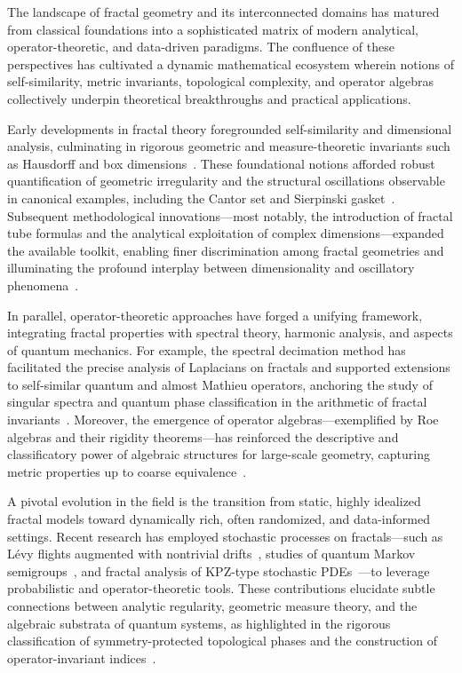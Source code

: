 \documentclass[sigconf]{acmart}
\begin{document}
The landscape of fractal geometry and its interconnected domains has matured from classical foundations into a sophisticated matrix of modern analytical, operator-theoretic, and data-driven paradigms. The confluence of these perspectives has cultivated a dynamic mathematical ecosystem wherein notions of self-similarity, metric invariants, topological complexity, and operator algebras collectively underpin theoretical breakthroughs and practical applications.

Early developments in fractal theory foregrounded self-similarity and dimensional analysis, culminating in rigorous geometric and measure-theoretic invariants such as Hausdorff and box dimensions~\cite{ref2,ref36}. These foundational notions afforded robust quantification of geometric irregularity and the structural oscillations observable in canonical examples, including the Cantor set and Sierpinski gasket~\cite{ref3}. Subsequent methodological innovations---most notably, the introduction of fractal tube formulas and the analytical exploitation of complex dimensions---expanded the available toolkit, enabling finer discrimination among fractal geometries and illuminating the profound interplay between dimensionality and oscillatory phenomena~\cite{ref3,ref36}.

In parallel, operator-theoretic approaches have forged a unifying framework, integrating fractal properties with spectral theory, harmonic analysis, and aspects of quantum mechanics. For example, the spectral decimation method has facilitated the precise analysis of Laplacians on fractals and supported extensions to self-similar quantum and almost Mathieu operators, anchoring the study of singular spectra and quantum phase classification in the arithmetic of fractal invariants~\cite{ref69,ref70,ref34}. Moreover, the emergence of operator algebras---exemplified by Roe algebras and their rigidity theorems---has reinforced the descriptive and classificatory power of algebraic structures for large-scale geometry, capturing metric properties up to coarse equivalence~\cite{ref52,ref80}.

A pivotal evolution in the field is the transition from static, highly idealized fractal models toward dynamically rich, often randomized, and data-informed settings. Recent research has employed stochastic processes on fractals---such as Lévy flights augmented with nontrivial drifts~\cite{ref4}, studies of quantum Markov semigroups~\cite{ref90}, and fractal analysis of KPZ-type stochastic PDEs~\cite{ref95}---to leverage probabilistic and operator-theoretic tools. These contributions elucidate subtle connections between analytic regularity, geometric measure theory, and the algebraic substrata of quantum systems, as highlighted in the rigorous classification of symmetry-protected topological phases and the construction of operator-invariant indices~\cite{ref66,ref67,ref68}.
\end{document}
